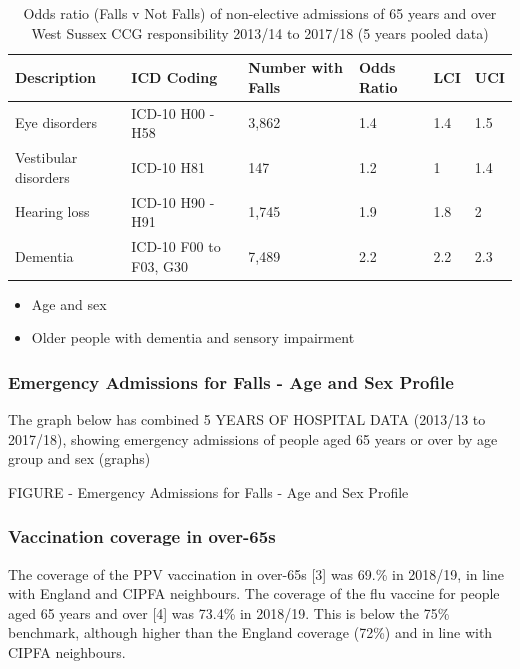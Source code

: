 \begin{table}
    \caption{Odds ratio (Falls v Not Falls) of non-elective admissions of 65 years and over West Sussex CCG responsibility 2013/14 to 2017/18 (5 years pooled data)}
    \centering
    \begin{tabular}{llllll}
        \toprule
        Description & ICD Coding & Number with Falls & Odds Ratio & LCI & UCI \\
        \midrule
        Eye disorders & ICD-10 H00 - H58 & 3,862 & 1.4 & 1.4 & 1.5 \\
        Vestibular disorders & ICD-10 H81 & 147 & 1.2 & 1 & 1.4 \\
        Hearing loss & ICD-10 H90 - H91 & 1,745 & 1.9 & 1.8 & 2 \\
        Dementia & ICD-10 F00 to F03, G30 & 7,489 & 2.2 & 2.2 & 2.3 \\
        \bottomrule
    \end{tabular}
    \label{tab:op:f_vs_nf}
\end{table}

\begin{tcolorbox}[colback={boxcolour},title={Key risk factors}]
    \begin{itemize}[noitemsep]
        \item Age and sex
        \item Older people with dementia and sensory impairment
    \end{itemize}
\end{tcolorbox}
    
\subsubsection{Emergency Admissions for Falls - Age and Sex Profile} The graph below has combined 5 YEARS OF HOSPITAL DATA (2013/13 to 2017/18), showing emergency admissions of people aged 65 years or over by age group and sex (graphs)

FIGURE - Emergency Admissions for Falls - Age and Sex Profile

\subsubsection{Vaccination coverage in over-65s}
The coverage of the PPV vaccination in over-65s [3] was 69.\% in 2018/19, in line with England and CIPFA neighbours. The coverage of the flu vaccine for people aged 65 years and over [4] was 73.4\% in 2018/19. This is below the 75\% benchmark, although higher than the England coverage (72\%) and in line with CIPFA neighbours.

